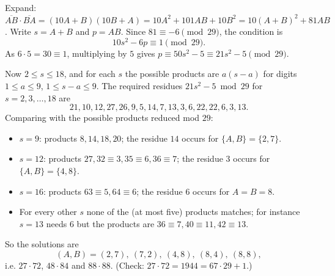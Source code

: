 Expand: $\overline{AB}\cdot\overline{BA}=(10A+B)(10B+A)=10A^2+101AB+10B^2=10(A+B)^2+81AB$. Write $s=A+B$ and $p=AB$. Since $81\equiv-6\pmod{29}$, the condition is
\[10s^2-6p\equiv1\pmod{29}.\]
As $6\cdot5=30\equiv1$, multiplying by $5$ gives $p\equiv50s^2-5\equiv21s^2-5\pmod{29}$.

Now $2\le s\le18$, and for each $s$ the possible products are $a(s-a)$ for digits $1\le a\le9$, $1\le s-a\le9$. The required residues $21s^2-5\bmod29$ for $s=2,3,\ldots,18$ are
\[21,10,12,27,26,9,5,14,7,13,3,6,22,22,6,3,13.\]
Comparing with the possible products reduced mod $29$:
\begin{itemize}
\item $s=9$: products $8,14,18,20$; the residue $14$ occurs for $\{A,B\}=\{2,7\}$.
\item $s=12$: products $27,32\equiv3,35\equiv6,36\equiv7$; the residue $3$ occurs for $\{A,B\}=\{4,8\}$.
\item $s=16$: products $63\equiv5,64\equiv6$; the residue $6$ occurs for $A=B=8$.
\item For every other $s$ none of the (at most five) products matches; for instance $s=13$ needs $6$ but the products are $36\equiv7,40\equiv11,42\equiv13$.
\end{itemize}
So the solutions are
\[\boxed{(A,B)=(2,7),\ (7,2),\ (4,8),\ (8,4),\ (8,8)},\]
i.e. $27\cdot72$, $48\cdot84$ and $88\cdot88$. (Check: $27\cdot72=1944=67\cdot29+1$.)
